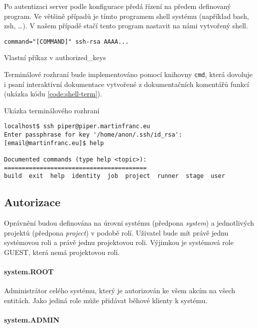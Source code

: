 Po autentizaci server podle konfigurace předá řízení na předem definovaný program.
Ve většině případů je tímto programem shell systému (například bash, zsh, \ldots).
V našem případě stačí tento program nastavit na námi vytvořený shell.

\begin{listing}[ht]
\begin{verbatim}
command="[COMMAND]" ssh-rsa AAAA...
\end{verbatim}
\caption{Vlastní příkaz v authorized\_keys}
\end{listing}

Terminálové rozhraní bude implementováno pomocí knihovny \verb|cmd|, která dovoluje i psaní interaktivní dokumentace vytvořené z dokumentačních komentářů funkcí (ukázka kódu \ref{code:shell-term}).

\begin{listing}[ht]
\caption{\label{code:shell-term}Ukázka terminálového rozhraní}
\begin{verbatim}
localhost$ ssh piper@piper.martinfranc.eu
Enter passphrase for key '/home/anon/.ssh/id_rsa': 
[email@martinfranc.eu]$ help

Documented commands (type help <topic>):
========================================
build  exit  help  identity  job  project  runner  stage  user

\end{verbatim}
\end{listing}

\subsection{Autorizace}

Oprávnění budou definována na úrovni systému (předpona \textit{system}) a jednotlivých projektů (předpona \textit{project}) v podobě rolí.
Uživatel bude mít právě jednu systémovou roli a právě jednu projektovou roli.
Výjimkou je systémová role GUEST, která nemá projektovou roli.

\paragraph{system.ROOT}

Administrátor celého systému, který je autorizován ke všem akcím na všech entitách.
Jako jediná role může přidávat běhové klienty k systému.

\paragraph{system.ADMIN}

